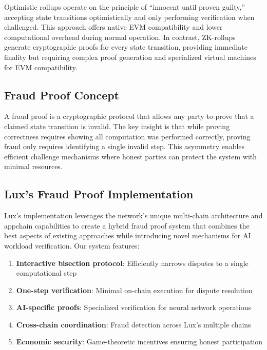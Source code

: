 Optimistic rollups operate on the principle of ``innocent until proven guilty,'' accepting state transitions optimistically and only performing verification when challenged. This approach offers native EVM compatibility and lower computational overhead during normal operation. In contrast, ZK-rollups generate cryptographic proofs for every state transition, providing immediate finality but requiring complex proof generation and specialized virtual machines for EVM compatibility.

\subsection{Fraud Proof Concept}

A fraud proof is a cryptographic protocol that allows any party to prove that a claimed state transition is invalid. The key insight is that while proving correctness requires showing all computation was performed correctly, proving fraud only requires identifying a single invalid step. This asymmetry enables efficient challenge mechanisms where honest parties can protect the system with minimal resources.

\subsection{Lux's Fraud Proof Implementation}

Lux's implementation leverages the network's unique multi-chain architecture and appchain capabilities to create a hybrid fraud proof system that combines the best aspects of existing approaches while introducing novel mechanisms for AI workload verification. Our system features:

\begin{enumerate}
    \item \textbf{Interactive bisection protocol}: Efficiently narrows disputes to a single computational step
    \item \textbf{One-step verification}: Minimal on-chain execution for dispute resolution
    \item \textbf{AI-specific proofs}: Specialized verification for neural network operations
    \item \textbf{Cross-chain coordination}: Fraud detection across Lux's multiple chains
    \item \textbf{Economic security}: Game-theoretic incentives ensuring honest participation
\end{enumerate}

